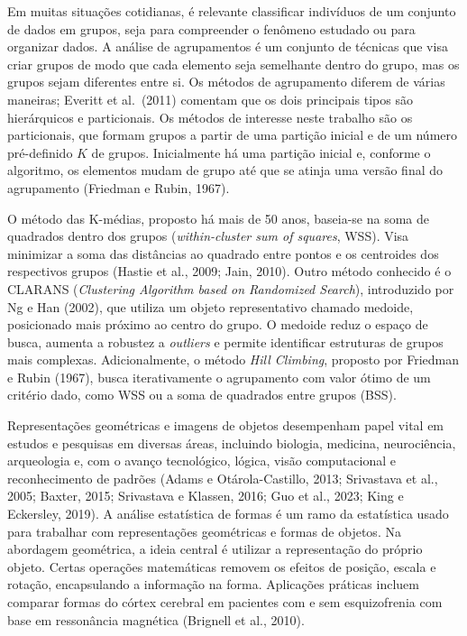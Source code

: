 \documentclass[11pt,a4paper]{article}
\begin{document}
Em muitas situações cotidianas, é relevante classificar indivíduos de um conjunto de dados em grupos, seja para compreender o fenômeno estudado ou para organizar dados. A análise de agrupamentos é um conjunto de técnicas que visa criar grupos de modo que cada elemento seja semelhante dentro do grupo, mas os grupos sejam diferentes entre si. Os métodos de agrupamento diferem de várias maneiras; Everitt et al.\ (2011) comentam que os dois principais tipos são hierárquicos e particionais. Os métodos de interesse neste trabalho são os particionais, que formam grupos a partir de uma partição inicial e de um número pré-definido $K$ de grupos. Inicialmente há uma partição inicial e, conforme o algoritmo, os elementos mudam de grupo até que se atinja uma versão final do agrupamento (Friedman e Rubin, 1967).

O método das K-médias, proposto há mais de 50 anos, baseia-se na soma de quadrados dentro dos grupos (\emph{within-cluster sum of squares}, WSS). Visa minimizar a soma das distâncias ao quadrado entre pontos e os centroides dos respectivos grupos (Hastie et al., 2009; Jain, 2010). Outro método conhecido é o CLARANS (\emph{Clustering Algorithm based on Randomized Search}), introduzido por Ng e Han (2002), que utiliza um objeto representativo chamado medoide, posicionado mais próximo ao centro do grupo. O medoide reduz o espaço de busca, aumenta a robustez a \emph{outliers} e permite identificar estruturas de grupos mais complexas. Adicionalmente, o método \emph{Hill Climbing}, proposto por Friedman e Rubin (1967), busca iterativamente o agrupamento com valor ótimo de um critério dado, como WSS ou a soma de quadrados entre grupos (BSS).

Representações geométricas e imagens de objetos desempenham papel vital em estudos e pesquisas em diversas áreas, incluindo biologia, medicina, neurociência, arqueologia e, com o avanço tecnológico, lógica, visão computacional e reconhecimento de padrões (Adams e Otárola-Castillo, 2013; Srivastava et al., 2005; Baxter, 2015; Srivastava e Klassen, 2016; Guo et al., 2023; King e Eckersley, 2019). A análise estatística de formas é um ramo da estatística usado para trabalhar com representações geométricas e formas de objetos. Na abordagem geométrica, a ideia central é utilizar a representação do próprio objeto. Certas operações matemáticas removem os efeitos de posição, escala e rotação, encapsulando a informação na forma. Aplicações práticas incluem comparar formas do córtex cerebral em pacientes com e sem esquizofrenia com base em ressonância magnética (Brignell et al., 2010).
\end{document}
